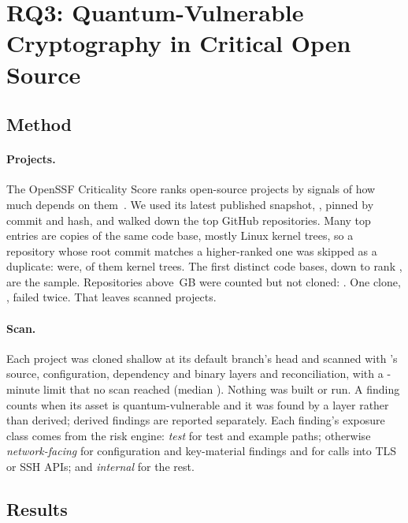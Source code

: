 \section{RQ3: Quantum-Vulnerable Cryptography in Critical Open Source}
\label{sec:rq3}

\subsection{Method}

\paragraph{Projects.} The OpenSSF Criticality Score ranks open-source
projects by signals of how much depends on them~\cite{criticality}. We used its
latest published snapshot, , pinned by commit and hash,
and walked down the top  GitHub repositories. Many
top entries are copies of the same code base, mostly Linux kernel trees, so a
repository whose root commit matches a higher-ranked one was skipped as a
duplicate:  were,  of
them kernel trees. The first  distinct code bases, down
to rank , are the sample. Repositories above
\,GB were counted but not cloned:
. One clone, , failed
twice. That leaves  scanned projects.

\paragraph{Scan.} Each project was cloned shallow at its default branch's head
and scanned with \tool{}'s source, configuration, dependency and binary layers
and reconciliation, with a -minute limit that no scan
reached (median ). Nothing was built or run. A
finding counts when its asset is quantum-vulnerable and it was found by a
layer rather than derived; derived findings are reported separately. Each
finding's exposure class comes from the risk engine: \emph{test} for test and
example paths; otherwise \emph{network-facing} for configuration and
key-material findings and for calls into TLS or SSH APIs; and
\emph{internal} for the rest.

\subsection{Results}

